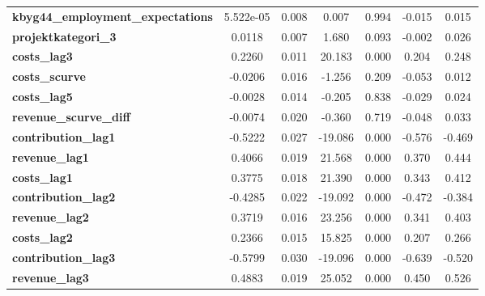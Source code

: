 \begin{center}
\begin{tabular}{lcccccc}
\textbf{kbyg44\_employment\_expectations}   &    5.522e-05  &        0.008     &     0.007  &         0.994        &       -0.015    &        0.015     \\
\textbf{projektkategori\_3}                 &       0.0118  &        0.007     &     1.680  &         0.093        &       -0.002    &        0.026     \\
\textbf{costs\_lag3}                        &       0.2260  &        0.011     &    20.183  &         0.000        &        0.204    &        0.248     \\
\textbf{costs\_scurve}                      &      -0.0206  &        0.016     &    -1.256  &         0.209        &       -0.053    &        0.012     \\
\textbf{costs\_lag5}                        &      -0.0028  &        0.014     &    -0.205  &         0.838        &       -0.029    &        0.024     \\
\textbf{revenue\_scurve\_diff}              &      -0.0074  &        0.020     &    -0.360  &         0.719        &       -0.048    &        0.033     \\
\textbf{contribution\_lag1}                 &      -0.5222  &        0.027     &   -19.086  &         0.000        &       -0.576    &       -0.469     \\
\textbf{revenue\_lag1}                      &       0.4066  &        0.019     &    21.568  &         0.000        &        0.370    &        0.444     \\
\textbf{costs\_lag1}                        &       0.3775  &        0.018     &    21.390  &         0.000        &        0.343    &        0.412     \\
\textbf{contribution\_lag2}                 &      -0.4285  &        0.022     &   -19.092  &         0.000        &       -0.472    &       -0.384     \\
\textbf{revenue\_lag2}                      &       0.3719  &        0.016     &    23.256  &         0.000        &        0.341    &        0.403     \\
\textbf{costs\_lag2}                        &       0.2366  &        0.015     &    15.825  &         0.000        &        0.207    &        0.266     \\
\textbf{contribution\_lag3}                 &      -0.5799  &        0.030     &   -19.096  &         0.000        &       -0.639    &       -0.520     \\
\textbf{revenue\_lag3}                      &       0.4883  &        0.019     &    25.052  &         0.000        &        0.450    &        0.526     \\

\end{tabular}
\end{center}

